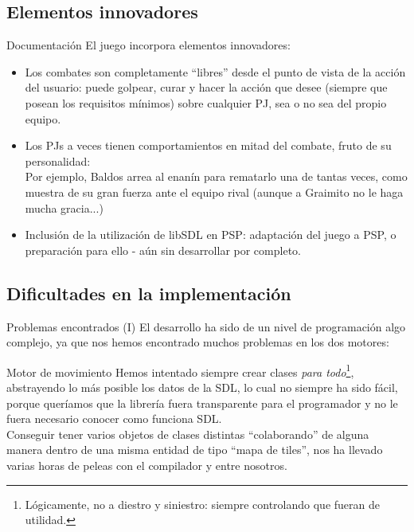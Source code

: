 \documentclass[9pt,xcolor=svgnames]{beamer}
\begin{document}
  \subsection{Elementos innovadores}

   \begin{frame}{Documentación}
    El juego incorpora elementos innovadores:
    \begin{itemize}
     \item Los combates son completamente ``libres'' desde el punto de
	   vista de la acción del usuario: puede golpear, curar y hacer
	   la acción que desee (siempre que posean los requisitos
	   mínimos) sobre cualquier PJ, sea o no sea del propio equipo.\\

     \item Los PJs a veces tienen comportamientos en mitad del combate,
	   fruto de su personalidad:\\
	   Por ejemplo, Baldos arrea al enanín para rematarlo una de
	   tantas veces, como muestra de su gran fuerza ante el equipo
	   rival (aunque a Graimito no le haga mucha gracia...)\\

     \item Inclusión de la utilización de libSDL en PSP:
	   adaptación del juego a PSP, o preparación para ello - aún sin
	   desarrollar por completo.

    \end{itemize}
   \end{frame}

   \subsection{Dificultades en la implementación}

   \begin{frame}{Problemas encontrados (I)}
   El desarrollo ha sido de un nivel de programación algo complejo, ya que
   nos hemos encontrado muchos problemas en los dos motores:

   \begin{block}{Motor de movimiento}
    Hemos intentado siempre crear clases \textit{para
    todo}\footnote{Lógicamente, no a diestro y siniestro: siempre
    controlando que fueran de utilidad.}, abstrayendo lo más posible
    los datos de la SDL, lo cual no siempre ha sido fácil, porque queríamos
    que la librería fuera transparente para el programador y no le fuera
    necesario conocer como funciona SDL.\\
    
    \vspace*{0.3cm}
    Conseguir tener varios objetos de clases distintas ``colaborando'' de
    alguna manera dentro de una misma entidad de tipo ``mapa de tiles'', nos
    ha llevado varias horas de peleas con el compilador y entre nosotros.
   \end{block}
   
   \end{frame}
\end{document}
